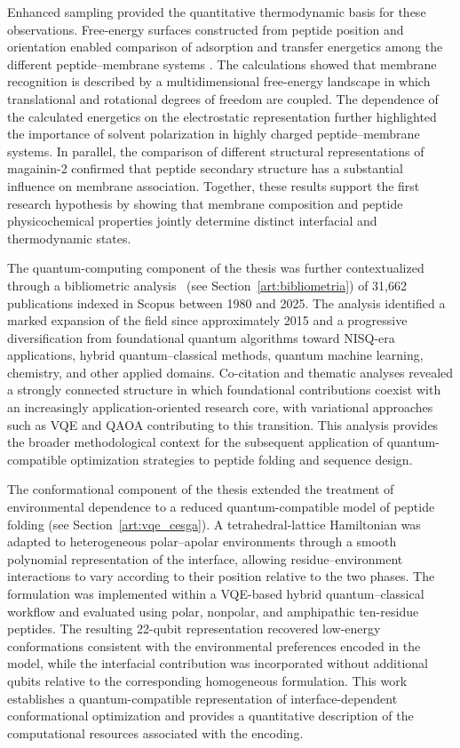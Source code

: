 Enhanced sampling provided the quantitative thermodynamic basis for these observations. Free-energy surfaces constructed from peptide position and orientation enabled comparison of adsorption and transfer energetics among the different peptide--membrane systems \cite{DANI_METADINAMICA}. The calculations showed that membrane recognition is described by a multidimensional free-energy landscape in which translational and rotational degrees of freedom are coupled. The dependence of the calculated energetics on the electrostatic representation further highlighted the importance of solvent polarization in highly charged peptide--membrane systems. In parallel, the comparison of different structural representations of magainin-2 confirmed that peptide secondary structure has a substantial influence on membrane association. Together, these results support the first research hypothesis by showing that membrane composition and peptide physicochemical properties jointly determine distinct interfacial and thermodynamic states.

The quantum-computing component of the thesis was further contextualized through a bibliometric analysis~\cite{paper_dani} (see Section~\ref{art:bibliometria}) of 31,662 publications indexed in Scopus between 1980 and 2025. The analysis identified a marked expansion of the field since approximately 2015 and a progressive diversification from foundational quantum algorithms toward NISQ-era applications, hybrid quantum–classical methods, quantum machine learning, chemistry, and other applied domains. Co-citation and thematic analyses revealed a strongly connected structure in which foundational contributions coexist with an increasingly application-oriented research core, with variational approaches such as VQE and QAOA contributing to this transition. This analysis provides the broader methodological context for the subsequent application of quantum-compatible optimization strategies to peptide folding and sequence design.


The conformational component of the thesis extended the treatment of environmental dependence to a reduced quantum-compatible model of peptide folding \cite{DANI_CUANTICA} (see Section~\ref{art:vqe_cesga}). A tetrahedral-lattice Hamiltonian was adapted to heterogeneous polar--apolar environments through a smooth polynomial representation of the interface, allowing residue--environment interactions to vary according to their position relative to the two phases. The formulation was implemented within a VQE-based hybrid quantum--classical workflow and evaluated using polar, nonpolar, and amphipathic ten-residue peptides. The resulting 22-qubit representation recovered low-energy conformations consistent with the environmental preferences encoded in the model, while the interfacial contribution was incorporated without additional qubits relative to the corresponding homogeneous formulation. This work establishes a quantum-compatible representation of interface-dependent conformational optimization and provides a quantitative description of the computational resources associated with the encoding.


